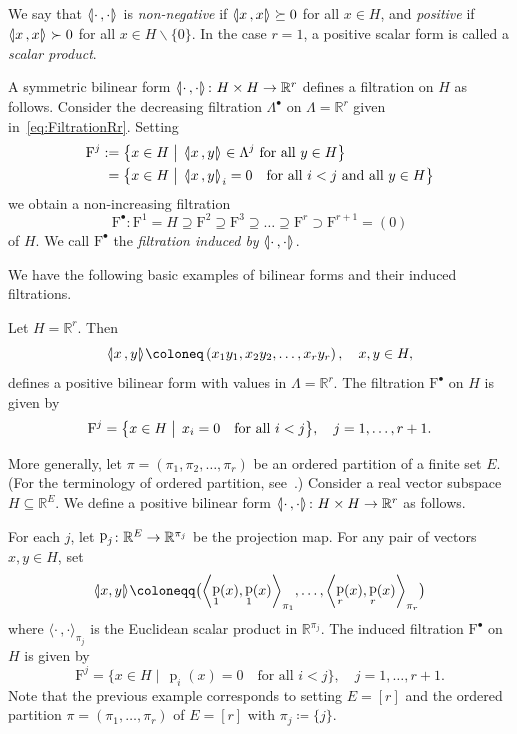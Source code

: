 \documentclass[AHL,Unicode,longabstracts]{cedram}
\newcommand{\innone}[2]{{\langle#2\rangle_{#1}}}
\newcommand{\binnone}[2]{{\left\langle#2\right\rangle_{#1}}}
\newcommand{\llangle}{\mathopen{\langle\mkern -3.1mu\lvert}}
\newcommand{\rrangle}{\mathclose{\rvert\mkern -3.1mu\rangle}}
\newcommand{\highinn}[2]{{\llangle#2\rrangle_{#1}}}
\DeclareMathOperator{\projeuc}{p}
\newcommand{\filter}{\mathrm{F}}
\newcommand{\R}{\mathbb{R}}
\renewcommand{\setminus}{\smallsetminus}
\renewcommand*{\to}{\mathchoice{\longrightarrow}{\rightarrow}{\rightarrow}{\rightarrow}}
\newcommand*{\Mk}{\mkern -2mu}
\newcommand*{\MK}{\mkern 2mu}
\begin{document}
We say that $\highinn{}{\cdot \,, \cdot}$ is \emph{non-negative} if $\highinn{}{x\,, x} \succeq 0$ for all $x \in H$, and \emph{positive} if $\highinn{}{x\,, x} \succ 0$ for all $x \in H \setminus \{0\}$. In the case $r=1$, a positive scalar form is called a \emph{scalar product}.

A symmetric bilinear form $\highinn{}{\cdot \,, \cdot} \colon H \times H \to \R^r$ defines a filtration on $H$ as follows. Consider the decreasing filtration $\Lambda^\bullet$ on $\Lambda = \R^r$ given in~\eqref{eq:FiltrationRr}. Setting
\begin{align}
\filter^j \,\MK &\!\Mk:= \bigl\{ x \in H \bigm| \,\highinn{}{x \,, y} \in \Lambda^j \text{ for all }y \in H\bigr\}\\
&= \bigl\{ x \in H \bigm| \,\highinn{}{x \,, y}_i = 0 \quad\text{for all }i <j\text{  and all }y \in H\bigr\}
\end{align}
we obtain a non-increasing filtration
\[
\filter^\bullet\colon \filter^1 = H \supseteq \filter^2 \supseteq \filter^3 \supseteq \dots \supseteq \filter^r \supset \filter^{r+1} = (0)
\]
of $H$. We call $\filter^\bullet$ the \emph{filtration induced by} $\highinn{}{\cdot \,, \cdot}$.


We have the following basic examples of bilinear forms and their induced filtrations.


\begin{exam} \label{ex:HigherRankEuclidean}
Let $H = \R^r$. Then
\[
\highinn{}{x\,, y} \coloneq \left(x_1y_1, x_2 y_2, \dots, x_r y_r\right), \quad x, y \in H,
\]
defines a positive bilinear form with values in $\Lambda = \R^r$. The filtration $\filter^\bullet$ on $H$ is given by
\begin{align*}
\filter^j = \bigl\{ x \in H \bigm| \, x_i = 0 \quad\text{for all $i <j$}\bigr\}, \quad j=1, \dots, r+1.%
\end{align*}
\end{exam}

\begin{exam} \label{ex:HigherRankProjection}
More generally, let $\pi=(\pi_1,\pi_2, \dots, \pi_r)$ be an ordered partition of a finite set $E$. (For the terminology of ordered partition, see~\cite[Section~2.2]{AN}.)
Consider a real vector subspace $H \subseteq \R^E$. We define a positive bilinear form $\highinn{}{\cdot\,, \cdot} \colon H \times H \to \R^r$ as follows.

For each $j$, let $\projeuc_{j} \colon \R^E \to \R^{\pi_j}$ be the projection map. For any pair of vectors $x, y \in H$, set
\[
\highinn{}{x, y} \coloneqq \bigl(\binnone{\pi_1}{\projeuc_{1}(x),\projeuc_{1}(x)}, \dots, \binnone{\pi_r}{\projeuc_{r}(x),\projeuc_{r}(x)} \big)
\]
where $\innone{\pi_j}{\cdot \,, \cdot}$ is the Euclidean scalar product in $\R^{\pi_j}$. The induced filtration $\filter^\bullet$ on $H$ is given by
\[
\filter^j = \{ x \in H \mid \, \projeuc_i(x) = 0 \quad\text{for all $i<j$} \}, \quad j = 1, \dots, r+1.
\]
Note that the previous example corresponds to setting $E = [r]$ and the ordered partition $\pi=(\pi_1, \dots, \pi_r)$ of $E = [r]$ with $\pi_j\coloneqq\{j\}$.%
\end{exam}
\end{document}
